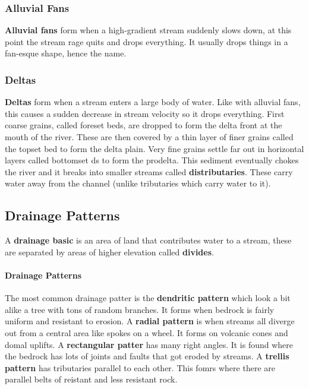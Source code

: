 \documentclass{article}
\begin{document}
\subsubsection{Alluvial Fans} %
\label{ssub:alluvial_fans}
\textbf{Alluvial fans} form when a high-gradient stream suddenly slows down, at this point the stream rage quits and drops everything. It usually drops things in a fan-esque shape, hence the name.

\subsubsection{Deltas} %
\label{ssub:deltas}
\textbf{Deltas} form when a stream enters a large body of water. Like with alluvial fans, this causes a sudden decrease in stream velocity so it drops everything. First coarse grains, called foreset beds, are dropped to form the delta front at the mouth of the river. These are then covered by a thin layer of finer grains called the topset bed to form the delta plain. Very fine grains settle far out in horizontal layers called bottomset ds to form the prodelta. This sediment eventually chokes the river and it breaks into smaller streams called \textbf{distributaries}. These carry water away from the channel (unlike tributaries which carry water to it).
\subsection{Drainage Patterns} %
\label{sub:drainage_patterns}
A \textbf{drainage basic} is an area of land that contributes water to a stream, these are separated by areas of higher elevation called \textbf{divides}.

\paragraph{Drainage Patterns} %
\label{par:drainage_patterns}
The most common drainage patter is the \textbf{dendritic pattern} which look a bit alike a tree with tons of random branches. It forms when bedrock is fairly uniform and resistant to erosion. A \textbf{radial pattern} is when streams all diverge out from a central area like spokes on a wheel. It forms on volcanic cones and domal uplifts. A \textbf{rectangular patter} has many right angles. It is found where the bedrock has lots of joints and faults that got eroded by streams. A \textbf{trellis pattern} has tributaries parallel to each other. This fomrs where there are parallel belts of reistant and less resistant rock.
\end{document}
